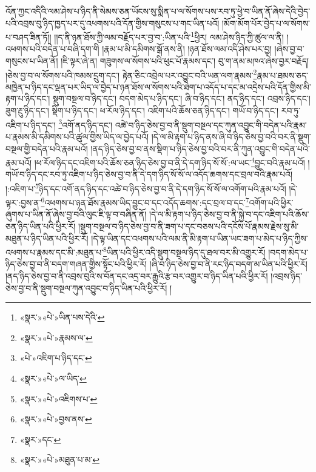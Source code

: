 འོན་ཀྱང་འདིའི་ལམ་ཤེས་པ་ཉིད་ནི་སེམས་ཅན་ཡོངས་སུ་སྨིན་པ་ལ་སོགས་པས་རབ་ཏུ་ཕྱེ་བ་ཡིན་ནོ་ཞེས་དེའི་བྱེད་པའི་འབྲས་བུ་ཉིད་ཁྱད་པར་དུ་འཕགས་པའི་དོན་གྱིས་གསུངས་པ་གང་ཡིན་པའོ། །མོག་མོག་པོར་བྱེད་པ་ལ་སོགས་པ་བཤད་ཟིན་ཏོ།། །།ད་ནི་ཉན་ཐོས་ཀྱི་ལམ་བརྗོད་པར་བྱ་བ་:ཡིན་པའི་\footnote{«སྣར་»«པེ་»ཡིན་པས་དེའི་}ཕྱིར། ལམ་ཤེས་ཉིད་ཀྱི་ཚུལ་ལ་ནི། །འཕགས་པའི་བདེན་པ་བཞི་དག་གི །རྣམ་པ་མི་དམིགས་སྒོ་ནས་ནི། །ཉན་ཐོས་ལམ་འདི་ཤེས་པར་བྱ། །ཞེས་བྱ་བ་གསུངས་པ་ཡིན་ནོ། །ཇི་ལྟར་ཞེ་ན། གཟུགས་ལ་སོགས་པའི་ཕུང་པོ་རྣམས་དང་། བུ་ག་ནམ་མཁའ་ཞེས་བྱར་བརྗོད། །ཅེས་བྱ་བ་ལ་སོགས་པའི་ཁམས་དྲུག་དང་། རྟེན་ཅིང་འབྲེལ་པར་འབྱུང་བའི་ཡན་ལག་རྣམས་\footnote{«སྣར་»«པེ་»རྣམས་ལ་}རྣམ་པ་ཐམས་ཅད་མཁྱེན་པ་ཉིད་དང་ལྡན་པར་ཡིད་ལ་བྱེད་པ་ཉན་ཐོས་ལ་སོགས་པའི་ཐེག་པ་འདོད་པ་དང་མ་འདྲེས་པའི་དོན་གྱིས་མི་རྟག་པ་ཉིད་དང་། སྡུག་བསྔལ་བ་ཉིད་དང་། བདག་མེད་པ་ཉིད་དང་། ཞི་བ་ཉིད་དང་། ནད་ཉིད་དང་། འབྲས་ཉིད་དང་། ཟུག་རྔུ་ཉིད་དང་། སྡིག་པ་ཉིད་དང་། ཕ་རོལ་ཉིད་དང་། འཇིག་པའི་ཆོས་ཅན་ཉིད་དང་། གཡོ་བ་ཉིད་དང་། རབ་ཏུ་འཇིག་པ་ཉིད་དང་། \footnote{«པེ་»འཇིག་པ་ཉིད་དང་}འགོ་ནད་ཉིད་དང་། འཚེ་བ་ཉིད་ཅེས་བྱ་བ་ནི་སྡུག་བསྔལ་དང་ཀུན་འབྱུང་གི་བདེན་པའི་རྣམ་པ་རྣམས་མི་དམིགས་པའི་ཚུལ་གྱིས་ཡིད་ལ་བྱེད་པའོ། །དེ་ལ་མི་རྟག་པ་ཉིད་ནས་ཞི་བ་ཉིད་ཅེས་བྱ་བའི་བར་ནི་སྡུག་བསྔལ་གྱི་བདེན་པའི་རྣམ་པའོ། །ནད་ཉིད་ཅེས་བྱ་བ་ནས་སྡིག་པ་ཉིད་ཅེས་བྱ་བའི་བར་ནི་ཀུན་འབྱུང་གི་བདེན་པའི་རྣམ་པའོ། །ཕ་རོལ་ཉིད་དང་འཇིག་པའི་ཆོས་ཅན་ཉིད་ཅེས་བྱ་བ་ནི་དེ་དག་ཉིད་སོ་སོ་:ལ་ཡང་\footnote{«སྣར་»«པེ་»ལ་ཡིད་}བྱུང་བའི་རྣམ་པའོ། །གཡོ་བ་ཉིད་དང་རབ་ཏུ་འཇིག་པ་ཉིད་ཅེས་བྱ་བ་ནི་དེ་དག་ཉིད་སོ་སོ་ལ་འདོད་ཆགས་དང་བྲལ་བའི་རྣམ་པའོ། །:འཇིག་པ་\footnote{«སྣར་»«པེ་»འཇིགས་པ་}ཉིད་དང་འགོ་ནད་ཉིད་དང་འཚེ་བ་ཉིད་ཅེས་བྱ་བ་ནི་དེ་དག་ཉིད་སོ་སོ་ལ་འགོག་པའི་རྣམ་པའོ། །དེ་ལྟར་:བྱས་ན་\footnote{«སྣར་»«པེ་»བྱས་ནས་}འཕགས་པ་ཉན་ཐོས་རྣམས་ཡིད་བྱུང་བ་དང་འདོད་ཆགས་:དང་བྲལ་བ་དང་\footnote{«སྣར་»དང་}འགོག་པའི་ཕྱིར་ཞུགས་པ་ཡིན་ནོ་ཞེས་བྱ་བའི་ལུང་ཇི་ལྟ་བ་བཞིན་ནོ། །དེ་ལ་མི་རྟག་པ་ཉིད་ཅེས་བྱ་བ་ནི་སྐྱེ་བ་དང་འཇིག་པའི་ཆོས་ཅན་ཉིད་ཡིན་པའི་ཕྱིར་རོ། །སྡུག་བསྔལ་བ་ཉིད་ཅེས་བྱ་བ་ནི་ཟག་པ་དང་བཅས་པའི་དངོས་པོ་རྣམས་རྗེས་སུ་མི་མཐུན་པ་ཉིད་ཡིན་པའི་ཕྱིར་རོ། །དེ་ལྟ་ཡིན་དང་འཕགས་པའི་ལམ་ནི་མི་རྟག་པ་ཡིན་ཡང་ཟག་པ་མེད་པ་ཉིད་ཀྱིས་འཕགས་པ་རྣམས་དང་མི་:མཐུན་པ་\footnote{«སྣར་»«པེ་»མཐུན་པ་མ་}ཡིན་པའི་ཕྱིར་འདི་སྡུག་བསྔལ་ཉིད་དུ་ཐལ་བར་མི་འགྱུར་རོ། །བདག་མེད་པ་ཉིད་ཅེས་བྱ་བ་ནི་བདག་གཞན་གྱིས་སྟོང་པའི་ཕྱིར་རོ། །ཞི་བ་ཉིད་ཅེས་བྱ་བ་ནི་རང་ཉིད་བདག་མ་ཡིན་པའི་ཕྱིར་རོ། །ནད་ཉིད་ཅེས་བྱ་བ་ནི་འབྲས་བུའི་ས་བོན་དང་འདྲ་བར་རྒྱུའི་རྩ་བར་འགྱུར་བ་ཉིད་ཡིན་པའི་ཕྱིར་རོ། །འབྲས་ཉིད་ཅེས་བྱ་བ་ནི་སྡུག་བསྔལ་ཀུན་འབྱུང་བ་ཉིད་ཡིན་པའི་ཕྱིར་རོ། །
